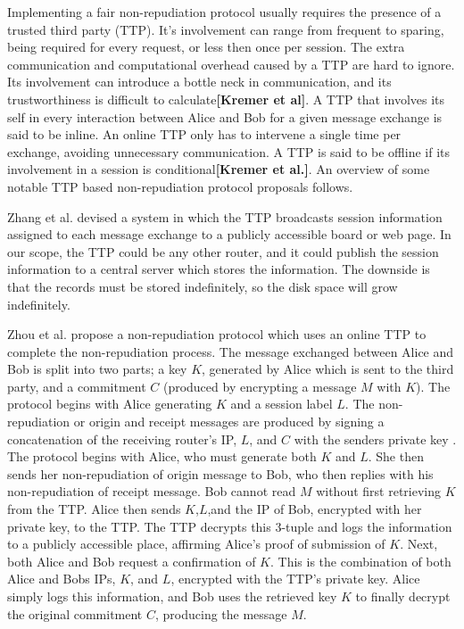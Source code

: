 \documentclass[12pt]{article}
\newcommand{\lcite}[1]
{{\bfseries\color{orange}[#1]}}
\begin{document}
			Implementing a fair non-repudiation protocol usually requires the presence of a trusted third party (TTP)\cite{zhou1996fair}. It's involvement can range from frequent to sparing, being required for every request, or less then once per session. The extra communication and computational overhead caused by a TTP are hard to ignore. Its involvement can introduce a bottle neck in communication, and its trustworthiness is difficult to calculate\lcite{Kremer et al}. A TTP that involves its self in every interaction between Alice and Bob for a given message exchange is said to be inline. An online TTP only has to intervene a single time per exchange, avoiding unnecessary communication. A TTP is said to be offline if its involvement in a session is conditional\lcite{Kremer et al.}. An overview of some notable TTP based non-repudiation protocol proposals follows. 

			Zhang et al. devised a system in which the TTP broadcasts session information assigned to each message exchange to a publicly accessible board or web page\cite{zhou1996fair}. In our scope, the TTP could be any other router, and it could publish the session information to a central server which stores the information. The downside is that the records must be stored indefinitely, so the disk space will grow indefinitely\cite{zhang1996achieving}.

			Zhou et al. propose a non-repudiation protocol which uses an online TTP to complete the non-repudiation process. The message exchanged between Alice and Bob is split into two parts; a key $K$, generated by Alice which is sent to the third party, and a commitment $C$ (produced by encrypting a message $M$ with $K$). The protocol begins with Alice generating $K$ and a session label $L$. The non-repudiation or origin and receipt messages are produced by signing a concatenation of the receiving router's IP, $L$, and $C$ with the senders private key . The protocol begins with Alice, who must generate both $K$ and $L$. She then sends her non-repudiation of origin message to Bob, who then replies with his non-repudiation of receipt message. Bob cannot read $M$ without first retrieving $K$ from the TTP. Alice then sends $K$,$L$,and the IP of Bob, encrypted with her private key, to the TTP. The TTP decrypts this 3-tuple and logs the information to a publicly accessible place, affirming Alice's proof of submission of $K$. Next, both Alice and Bob request a confirmation of $K$. This is the combination of both Alice and Bobs IPs, $K$, and $L$, encrypted with the TTP's private key. Alice simply logs this information, and Bob uses the retrieved key $K$ to finally decrypt the original commitment $C$, producing the message $M$\cite{zhou1996fair}.
\end{document}
